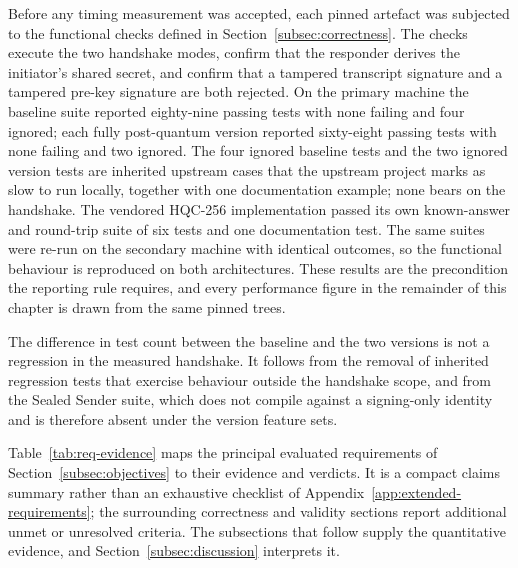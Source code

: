 Before any timing measurement was accepted, each pinned artefact was subjected to the functional checks defined in Section~\ref{subsec:correctness}. The checks execute the two handshake modes, confirm that the responder derives the initiator's shared secret, and confirm that a tampered transcript signature and a tampered pre-key signature are both rejected. On the primary machine the baseline suite reported eighty-nine passing tests with none failing and four ignored; each fully post-quantum version reported sixty-eight passing tests with none failing and two ignored. The four ignored baseline tests and the two ignored version tests are inherited upstream cases that the upstream project marks as slow to run locally, together with one documentation example; none bears on the handshake. The vendored HQC-256 implementation passed its own known-answer and round-trip suite of six tests and one documentation test. The same suites were re-run on the secondary machine with identical outcomes, so the functional behaviour is reproduced on both architectures. These results are the precondition the reporting rule requires, and every performance figure in the remainder of this chapter is drawn from the same pinned trees.

The difference in test count between the baseline and the two versions is not a regression in the measured handshake. It follows from the removal of inherited regression tests that exercise behaviour outside the handshake scope, and from the Sealed Sender suite, which does not compile against a signing-only identity and is therefore absent under the version feature sets.

Table~\ref{tab:req-evidence} maps the principal evaluated requirements of Section~\ref{subsec:objectives} to their evidence and verdicts. It is a compact claims summary rather than an exhaustive checklist of Appendix~\ref{app:extended-requirements}; the surrounding correctness and validity sections report additional unmet or unresolved criteria. The subsections that follow supply the quantitative evidence, and Section~\ref{subsec:discussion} interprets it.

